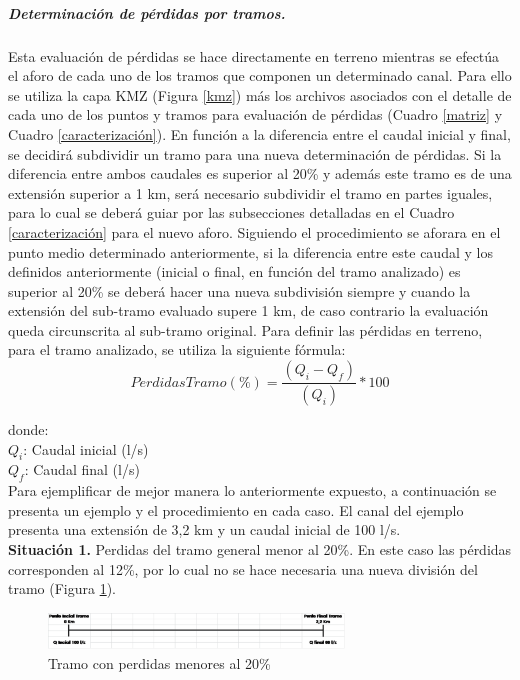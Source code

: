 \documentclass[]{article}
\begin{document}
\subparagraph{Determinación de pérdidas por tramos.}
Esta evaluación de pérdidas se hace directamente en terreno mientras se efectúa el aforo de cada uno de los tramos que componen un determinado canal. Para ello se utiliza la capa KMZ (Figura \ref{kmz}) más los archivos asociados con el detalle de cada uno de los puntos y tramos para evaluación de pérdidas (Cuadro \ref{matriz} y Cuadro \ref{caracterización}). En función a la diferencia entre el caudal inicial y final, se decidirá subdividir un tramo para una nueva determinación de pérdidas.  Si la diferencia entre ambos caudales es superior al 20\% y además este tramo es de una extensión superior a 1 km, será necesario subdividir el tramo en partes iguales, para lo cual se deberá guiar por las subsecciones detalladas en el Cuadro \ref{caracterización} para el nuevo aforo. Siguiendo el procedimiento se aforara en el punto medio determinado anteriormente, si la diferencia entre este caudal y los definidos  anteriormente (inicial o final, en función del tramo analizado) es superior al 20\% se deberá hacer una nueva subdivisión siempre y cuando la extensión del sub-tramo evaluado supere 1 km, de caso contrario la evaluación queda circunscrita al sub-tramo original. Para definir las pérdidas en terreno, para el tramo analizado, se utiliza la siguiente fórmula:
\begin{equation}
Perdidas Tramo (\%)=\frac{(Q_i - Q_f)}{(Q_i)}*100
\end{equation}

donde:\\
$Q_i$: Caudal inicial (l/s)\\
$Q_f$: Caudal final (l/s)\\

Para ejemplificar de mejor manera lo anteriormente expuesto, a continuación se presenta un ejemplo y el procedimiento en cada caso. El canal del ejemplo presenta una extensión de 3,2 km y un caudal inicial de 100 l/s.\\

\textbf{Situación 1.} Perdidas del tramo general menor al 20\%. En este caso las pérdidas corresponden al 12\%, por lo cual no se hace necesaria una nueva división del tramo (Figura \ref{sit_1}).

\begin{figure}[h]
\centering
\includegraphics[width=0.7\textwidth]{images/sit_1.eps}
\caption{Tramo con perdidas menores al 20\%}
\label{sit_1}
\end{figure}
\end{document}
